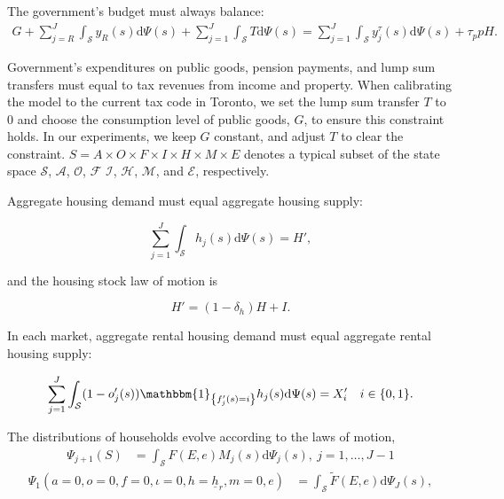 \documentclass[parskip=full]{article}
\newcommand{\indicator}[1]{\mathbbm{1}_{\left\{ {#1} \right\} }}
\begin{document}
The government's budget must always balance:
\begin{align}\label{eq:gbc}
  G + \sum_{j=R}^J \int_\mathcal{S} y_{R}(s) \mathrm{d}\Psi(s) + \sum_{j=1}^J \int_\mathcal{S} T \mathrm{d}\Psi(s) = \sum_{j=1}^J \int_\mathcal{S}y^{\tau}_{j}(s) \mathrm{d}\Psi(s)+\tau_{p} p H.
\end{align}

\noindent Government's expenditures on public goods, pension payments, and lump sum transfers must equal to tax revenues from income and property. When calibrating the model to the current tax code in Toronto, we set the lump sum transfer $T$ to 0 and choose the consumption level of public goods, $G$, to ensure this constraint holds. In our experiments, we keep $G$ constant, and adjust $T$ to clear the constraint. $S=A\times O \times F \times I \times H \times M \times E$ denotes a typical subset of the state space $\mathcal{S}$, $\mathcal{A}$, $\mathcal{O}$, $\mathcal{F}$ $\mathcal{I}$, $\mathcal{H}$, $\mathcal{M}$, and $\mathcal{E}$, respectively.

Aggregate housing demand must equal aggregate housing supply:

\begin{equation}
\label{eq:housing_clearing_condition}
  \sum_{j=1}^J \int_\mathcal{S} h_{j}(s) \mathrm{d}\Psi(s) = H',
\end{equation}

\noindent and the housing stock law of motion is 

\begin{equation}\label{eq:housing_stock_lom}
H'=(1-\delta_h)H + I.
\end{equation}

\noindent In each market, aggregate rental housing demand must equal aggregate rental housing supply:

\begin{equation}
\label{eq:rental_housing_clearing_condition}
  \sum_{j=1}^J \int_\mathcal{S} (1-o'_{j}(s))\indicator{f'_{j}(s)=i}h_{j}(s) \mathrm{d}\Psi(s) = X'_{i} \quad i \in \{0,1\}.
\end{equation}

The distributions of households evolve according to the laws of motion,
\begin{align}
\Psi_{j+1}(S) &=\int_{\mathcal{S}} F(E,e)M_{j}(s)\mathrm{d}\Psi_{j}(s),\ j=1,\ldots,J-1\label{eq:lom1}
\end{align}
\begin{align}
\Psi_{1}(a=0,o=0,f=0,\iota=0,h=\underline{h}_{r},m=0,e) &=\int_{\mathcal{S}}\tilde{F}(E,e) \mathrm{d}\Psi_{J}(s),\label{eq:lom2}
\end{align}
\end{document}
